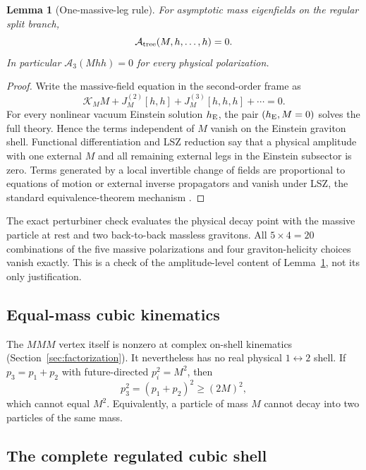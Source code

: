 \documentclass[11pt]{article}
\newtheorem{lemma}[theorem]{Lemma}
\theoremstyle{definition}
\theoremstyle{remark}
\begin{document}
\begin{lemma}[One-massive-leg rule]\label{lem:onemassive}
For asymptotic mass eigenfields on the regular split branch,
\begin{equation}\label{eq:onemassive}
\mathcal A_{\rm tree}(M,h,\ldots,h)=0.
\end{equation}
In particular $\mathcal A_3(Mhh)=0$ for every physical polarization.
\end{lemma}

\begin{proof}
Write the massive-field equation in the second-order frame as
\begin{equation}
\mathcal K_M M+J_M^{(2)}[h,h]+J_M^{(3)}[h,h,h]+\cdots=0.
\end{equation}
For every nonlinear vacuum Einstein solution $h_{\rm E}$, the pair
$(h_{\rm E},M=0)$ solves the full theory.  Hence the terms independent of
$M$ vanish on the Einstein graviton shell.  Functional differentiation
and LSZ reduction say that a physical amplitude with one external $M$
and all remaining external legs in the Einstein subsector is zero.
Terms generated by a local invertible change of fields are proportional
to equations of motion or external inverse propagators and vanish under
LSZ, the standard equivalence-theorem mechanism \cite{KOS}.
\end{proof}

The exact perturbiner check evaluates the physical decay point with the
massive particle at rest and two back-to-back massless gravitons.  All
$5\times4=20$ combinations of the five massive polarizations and four
graviton-helicity choices vanish exactly.  This is a check of the
amplitude-level content of Lemma~\ref{lem:onemassive}, not its only
justification.

\subsection{Equal-mass cubic kinematics}

The $MMM$ vertex itself is nonzero at complex on-shell kinematics
(Section~\ref{sec:factorization}).  It nevertheless has no real physical
$1\leftrightarrow2$ shell.  If $p_3=p_1+p_2$ with future-directed
$p_i^2=M^2$, then
\begin{equation}
p_3^2=(p_1+p_2)^2\ge(2M)^2,
\end{equation}
which cannot equal $M^2$.  Equivalently, a particle of mass $M$ cannot
decay into two particles of the same mass.

\subsection{The complete regulated cubic shell}
\end{document}

